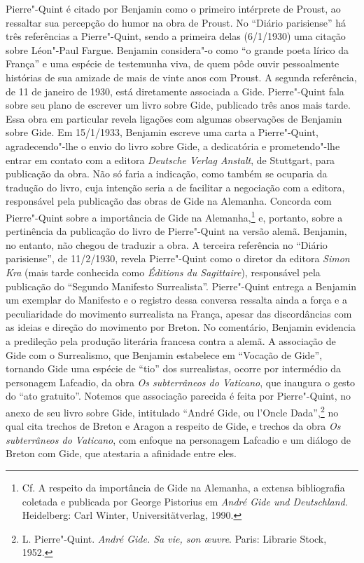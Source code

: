 Pierre"-Quint é citado por Benjamin como o primeiro intérprete de Proust,
ao ressaltar sua percepção do humor na obra de Proust. No ``Diário
parisiense'' há três referências a Pierre"-Quint, sendo a primeira delas
(6/1/1930) uma citação sobre Léon"-Paul Fargue. Benjamin considera"-o como
``o grande poeta lírico da França'' e uma espécie de testemunha viva, de
quem pôde ouvir pessoalmente histórias de sua amizade de mais de vinte
anos com Proust. A segunda referência, de 11 de janeiro de 1930, está
diretamente associada a Gide. Pierre"-Quint fala sobre seu plano de
escrever um livro sobre Gide, publicado três anos mais tarde. Essa obra
em particular revela ligações com algumas observações de Benjamin sobre
Gide. Em 15/1/1933, Benjamin escreve uma carta a Pierre"-Quint,
agradecendo"-lhe o envio do livro sobre Gide, a dedicatória e
prometendo"-lhe entrar em contato com a editora \emph{Deutsche Verlag
Anstalt}, de Stuttgart, para publicação da obra. Não só faria a
indicação, como também se ocuparia da tradução do livro, cuja intenção
seria a de facilitar a negociação com a editora, responsável pela
publicação das obras de Gide na Alemanha. Concorda com Pierre"-Quint
sobre a importância de Gide na Alemanha,\footnote{Cf. A respeito da
  importância de Gide na Alemanha, a extensa bibliografia coletada e
  publicada por George Pistorius em \emph{André Gide und Deutschland}.
  Heidelberg: Carl Winter, Universitätverlag, 1990.} e, portanto, sobre
a pertinência da publicação do livro de Pierre"-Quint na versão alemã.
Benjamin, no entanto, não chegou de traduzir a obra. A terceira %
referência no ``Diário parisiense'', de 11/2/1930, revela Pierre"-Quint
como o diretor da editora \emph{Simon Kra} (mais tarde conhecida como
\emph{Éditions du Sagittaire}), responsável pela publicação do ``Segundo
Manifesto Surrealista''. Pierre"-Quint entrega a Benjamin um exemplar do
Manifesto e o registro dessa conversa ressalta ainda a força e a
peculiaridade do movimento surrealista na França, apesar das
discordâncias com as ideias e direção do movimento por Breton. No
comentário, Benjamin evidencia a predileção pela produção literária
francesa contra a alemã. A associação de Gide com o Surrealismo, que
Benjamin estabelece em ``Vocação de Gide'', tornando Gide uma espécie de
``tio'' dos surrealistas, ocorre por intermédio da personagem
Lafcadio, da obra \emph{Os subterrâneos do Vaticano}, que
inaugura o gesto do ``ato gratuito''. Notemos que associação parecida é
feita por Pierre"-Quint, no anexo de seu livro sobre Gide, intitulado
``André Gide, ou l'Oncle Dada'',\footnote{L. Pierre"-Quint. \emph{André
  Gide. Sa vie, son \oe uvre}. Paris: Librarie Stock, 1952.} no qual
cita trechos de Breton e Aragon a respeito de Gide, e trechos da obra
\emph{Os subterrâneos do Vaticano}, com enfoque na personagem
Lafcadio e um diálogo de Breton com Gide, que atestaria a afinidade
entre eles.

